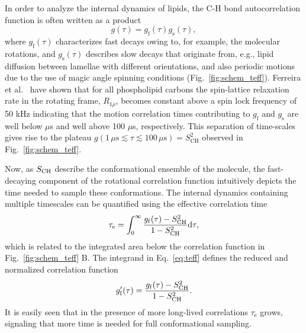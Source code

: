 \documentclass[journal=jcisd8,manuscript=article,layout=twocolumn]{achemso}
\begin{document}
In order to analyze the internal dynamics of lipids, 
the C-H bond autocorrelation function is often written as a product %
\begin{equation}
g(\tau)=g_{\mathrm{f}}(\tau)g_{\mathrm{s}}(\tau) ,
\end{equation}
where $g_{\mathrm{f}}(\tau)$ characterizes fast decays owing to, for example, the molecular  rotations, and $g_{\mathrm{s}}(\tau)$ describes slow decays that originate from, e.g., lipid diffusion between lamellae with different orientations, and also periodic motions due to the use of magic angle spinning conditions (Fig.~\ref{fig:schem_teff}).
Ferreira et al.~\cite{ferreira15} have shown that for all phospholipid carbons the spin-lattice relaxation rate in the rotating frame, $R_{1\rho}$, becomes constant above a spin lock frequency of 50 kHz indicating that the motion correlation times contributing to $g_{\mathrm{f}}$ and $g_{\mathrm{s}}$ are well below $\mu$s and well above 100 $\mu$s, respectively.
This separation of time-scales gives rise to the plateau $g(1\,\mu\mathrm s  \lesssim \tau \lesssim 100\,\mu\mathrm s)=S^2_\mathrm{CH}$ observed in Fig.~\ref{fig:schem_teff}.

Now, as $S_{\rm{CH}}$ describe the conformational ensemble of the molecule, the fast-decaying component of the rotational correlation function intuitively depicts the time needed to sample these conformations.
The internal dynamics containing multiple timescales can be quantified using the effective correlation time
\begin{equation}
\label{eq:teff}
\tau_\mathrm{e}=\int_{0}^{\infty}\frac{g_{\mathrm{f}}(\tau)-S^{2}_{\rm{CH}}}{1-S^2_{\mathrm{CH}}}\mathrm d\tau,
\end{equation}
which is related to the integrated area below the correlation function in Fig.~\ref{fig:schem_teff} B.
The integrand in Eq.~\eqref{eq:teff} defines the reduced and normalized correlation function
\begin{equation}
\label{eq:nBCF}
g'_{\mathrm{f}}(\tau)=\frac{g_{\mathrm{f}}(\tau)-S^{2}_{\rm{CH}}}{1-S^2_{\mathrm{CH}}}.
\end{equation}
It is easily seen that in the presence of more long-lived correlations $\tau_\mathrm{e}$ grows, signaling that more time is needed for full conformational sampling.
\end{document}
